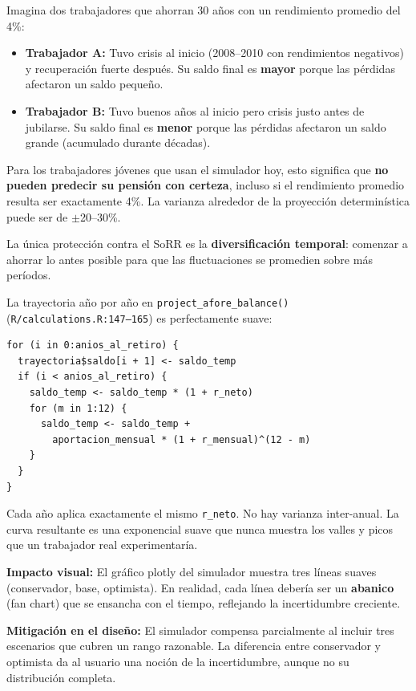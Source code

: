 \documentclass[11pt,a4paper]{report}
\begin{document}
\begin{tcolorbox}[colback=green!5!white, colframe=green!50!black, title=\textbf{Intuici\'on: El Orden de los Rendimientos Importa Tanto como su Promedio}]
Imagina dos trabajadores que ahorran 30 a\~nos con un rendimiento promedio del 4\%:

\begin{itemize}
  \item \textbf{Trabajador A:} Tuvo crisis al inicio (2008--2010 con rendimientos negativos) y recuperaci\'on fuerte despu\'es. Su saldo final es \textbf{mayor} porque las p\'erdidas afectaron un saldo peque\~no.

  \item \textbf{Trabajador B:} Tuvo buenos a\~nos al inicio pero crisis justo antes de jubilarse. Su saldo final es \textbf{menor} porque las p\'erdidas afectaron un saldo grande (acumulado durante d\'ecadas).
\end{itemize}

Para los trabajadores j\'ovenes que usan el simulador hoy, esto significa que \textbf{no pueden predecir su pensi\'on con certeza}, incluso si el rendimiento promedio resulta ser exactamente 4\%. La varianza alrededor de la proyecci\'on determin\'istica puede ser de $\pm$20--30\%.

La \'unica protecci\'on contra el SoRR es la \textbf{diversificaci\'on temporal}: comenzar a ahorrar lo antes posible para que las fluctuaciones se promedien sobre m\'as per\'iodos.
\end{tcolorbox}

\begin{tcolorbox}[colback=orange!5!white, colframe=orange!75!black, title=\textbf{Aplicaci\'on en C\'odigo: Trayectoria Determin\'istica sin Varianza}]
La trayectoria a\~no por a\~no en \texttt{project\_afore\_balance()} (\texttt{R/calculations.R:147--165}) es perfectamente suave:

\begin{lstlisting}
for (i in 0:anios_al_retiro) {
  trayectoria$saldo[i + 1] <- saldo_temp
  if (i < anios_al_retiro) {
    saldo_temp <- saldo_temp * (1 + r_neto)
    for (m in 1:12) {
      saldo_temp <- saldo_temp +
        aportacion_mensual * (1 + r_mensual)^(12 - m)
    }
  }
}
\end{lstlisting}

Cada a\~no aplica exactamente el mismo \texttt{r\_neto}. No hay varianza inter-anual. La curva resultante es una exponencial suave que nunca muestra los valles y picos que un trabajador real experimentar\'ia.

\textbf{Impacto visual:} El gr\'afico plotly del simulador muestra tres l\'ineas suaves (conservador, base, optimista). En realidad, cada l\'inea deber\'ia ser un \textbf{abanico} (fan chart) que se ensancha con el tiempo, reflejando la incertidumbre creciente.

\textbf{Mitigaci\'on en el dise\~no:} El simulador compensa parcialmente al incluir tres escenarios que cubren un rango razonable. La diferencia entre conservador y optimista da al usuario una noci\'on de la incertidumbre, aunque no su distribuci\'on completa.
\end{tcolorbox}
\end{document}
